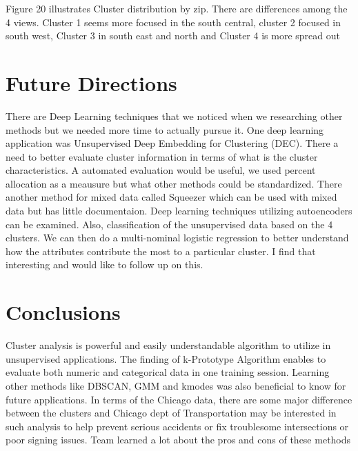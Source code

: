 \documentclass[conference]{IEEEtran}
\begin{document}
\begin{center}
\begin{figure}[h!]
\begin{tabular}{@{} r @{} *{2}{M{0.13\textheight}} @{}}
	\end{tabular}
	\end{figure}

Figure 20 illustrates Cluster distribution by zip.  There are differences among the 4 views. Cluster 1 seems more focused in the south central, cluster 2 focused in south west, Cluster 3 in south east and north and Cluster 4 is more spread out	

\section{Future Directions}
There are Deep Learning techniques that we noticed when we researching other methods but we needed more time to actually pursue it.  One deep learning application was Unsupervised Deep Embedding for Clustering (DEC).  There a need to better evaluate cluster information in terms of what is the cluster characteristics.  A automated evaluation would be useful, we used percent allocation as a meausure but what other methods could be standardized.  There another method for mixed data called Squeezer which can be used with mixed data but has little documentaion.  Deep learning techniques utilizing autoencoders can be examined.  Also, classification of the unsupervised data based on the 4 clusters.  We can then do a multi-nominal logistic regression to better understand how the attributes contribute the most to a particular cluster.  I find that interesting and would like to follow up on this. 
\section{Conclusions}

Cluster analysis is powerful and easily understandable algorithm to utilize in unsupervised applications.  The finding of k-Prototype Algorithm enables to evaluate both numeric and categorical data in one training session.  Learning other methods like DBSCAN, GMM and kmodes was also beneficial to know for future applications.  In terms of the Chicago data, there are some major difference between the clusters and Chicago dept of Transportation may be interested in such analysis to help prevent serious accidents or fix troublesome intersections or poor signing issues. Team learned a lot about the pros and cons of these methods

 

\end{center}
\end{document}
